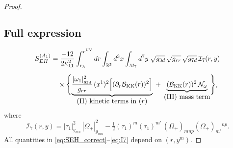 \documentclass[a4paper,11pt,fleqn]{article}
\theoremstyle{plain}
\theoremstyle{definition}
\newcommand{\ta}{\tau}
\newcommand{\Nf}{{\cal B}_{\rm KK}(r)}
\newcommand{\gthree}{g_{3d}}
\newcommand{\gseven}{g_{7d}}
\newcommand{\grr}{g_{rr}}
\newcommand{\kap}{\kappa_{11}}
\newcommand{\Ical}{\mathcal{I}_7}
\begin{document}
\begin{proof}
\subsection*{Full expression}

\begin{align}
  S_{EH}^{(A_1)}
  &= \frac{-12}{2\kap^2}
     \int_{r_h}^{r^{\rm UV}}dr
     \int_{\mathbb{R}^3}d^3x
     \int_{M_7}d^7y\;
        \sqrt{\gthree}\,\sqrt{\grr}\,\sqrt{\gseven}\,
     \Ical(r,y)
  \nonumber\\[6pt]
  &\quad\times
  \Biggl\{
    \underbrace{
      \frac{|\omega_1|^2_{g_{3d}}}{\grr}\,(x^1)^2
      \Bigl[
        (\partial_r\Nf)^2\Bigr]}_{\displaystyle\text{(II) kinetic terms in }(r)}
    \;+\;
    \underbrace{
      (\Nf)^2\,\mathcal{N}_\omega
    }_{\displaystyle\text{(III) mass term}}
  \Biggr\},
  \label{eq:SEH_correct}
\end{align}
where
\begin{equation}
  \Ical(r,y)= |\ta_1|^2_{g_{mn}}\,|\Omega_+|^2_{g_{mn}}
     - \tfrac{1}{2}(\ta_1)^m(\ta_1)^{m'}\,
       (\Omega_+)_{mnp}(\Omega_+)_{m'}{}^{np}.
  \label{eq:I7}
\end{equation}
All quantities in \eqref{eq:SEH_correct}--\eqref{eq:I7}
depend on $(r,y^m)$.
\end{proof}
\end{document}
